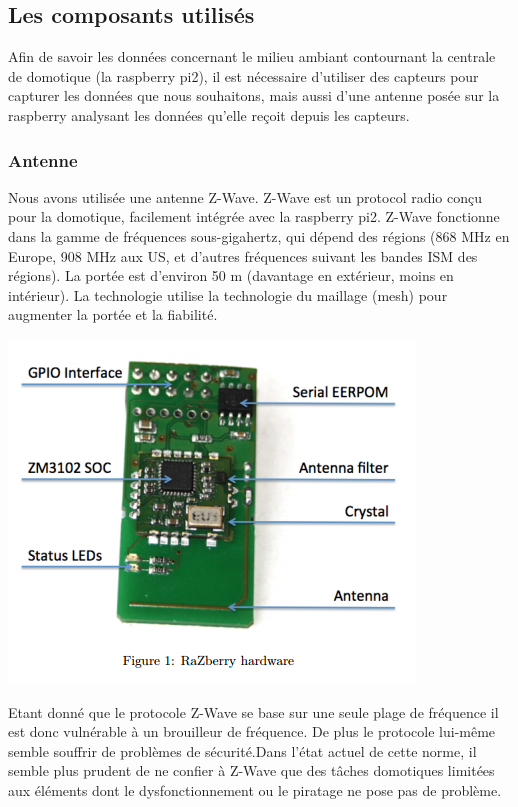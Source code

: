 \subsection{Les composants utilisés}
Afin de savoir les données concernant le milieu ambiant contournant la centrale de domotique (la raspberry pi2), il est nécessaire d'utiliser des capteurs pour capturer les données que nous souhaitons, mais aussi d'une antenne posée sur la raspberry analysant les données qu'elle reçoit depuis les capteurs.

\subsubsection{Antenne}
Nous avons utilisée une antenne Z-Wave. Z-Wave est un protocol radio conçu pour la domotique, facilement intégrée avec la raspberry pi2. Z-Wave fonctionne dans la gamme de fréquences sous-gigahertz, qui dépend des régions (868 MHz en Europe, 908 MHz aux US, et d'autres fréquences suivant les bandes ISM des régions). La portée est d'environ 50 m (davantage en extérieur, moins en intérieur). La technologie utilise la technologie du maillage (mesh) pour augmenter la portée et la fiabilité.

\includegraphics[scale=0.5]{./latex/Images/png/Zwave.png}\newline

Etant donné que le protocole Z-Wave se base sur une seule plage de fréquence il est donc vulnérable à un brouilleur de fréquence.
 De plus le protocole lui-même semble souffrir de problèmes de sécurité.Dans l'état actuel de cette norme, il semble plus prudent de ne confier à Z-Wave que des tâches domotiques limitées aux éléments dont le dysfonctionnement ou le piratage ne pose pas de problème.
